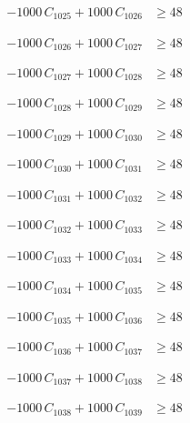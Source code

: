 \documentclass[a4paper,11pt]{article}
\begin{document}
\begin{align}
-1000\,C_{1025} + 1000\,C_{1026} &\geq 48 \nonumber
\end{align}

\begin{align}
-1000\,C_{1026} + 1000\,C_{1027} &\geq 48 \nonumber
\end{align}

\begin{align}
-1000\,C_{1027} + 1000\,C_{1028} &\geq 48 \nonumber
\end{align}

\begin{align}
-1000\,C_{1028} + 1000\,C_{1029} &\geq 48 \nonumber
\end{align}

\begin{align}
-1000\,C_{1029} + 1000\,C_{1030} &\geq 48 \nonumber
\end{align}

\begin{align}
-1000\,C_{1030} + 1000\,C_{1031} &\geq 48 \nonumber
\end{align}

\begin{align}
-1000\,C_{1031} + 1000\,C_{1032} &\geq 48 \nonumber
\end{align}

\begin{align}
-1000\,C_{1032} + 1000\,C_{1033} &\geq 48 \nonumber
\end{align}

\begin{align}
-1000\,C_{1033} + 1000\,C_{1034} &\geq 48 \nonumber
\end{align}

\begin{align}
-1000\,C_{1034} + 1000\,C_{1035} &\geq 48 \nonumber
\end{align}

\begin{align}
-1000\,C_{1035} + 1000\,C_{1036} &\geq 48 \nonumber
\end{align}

\begin{align}
-1000\,C_{1036} + 1000\,C_{1037} &\geq 48 \nonumber
\end{align}

\begin{align}
-1000\,C_{1037} + 1000\,C_{1038} &\geq 48 \nonumber
\end{align}

\begin{align}
-1000\,C_{1038} + 1000\,C_{1039} &\geq 48 \nonumber
\end{align}
\end{document}
